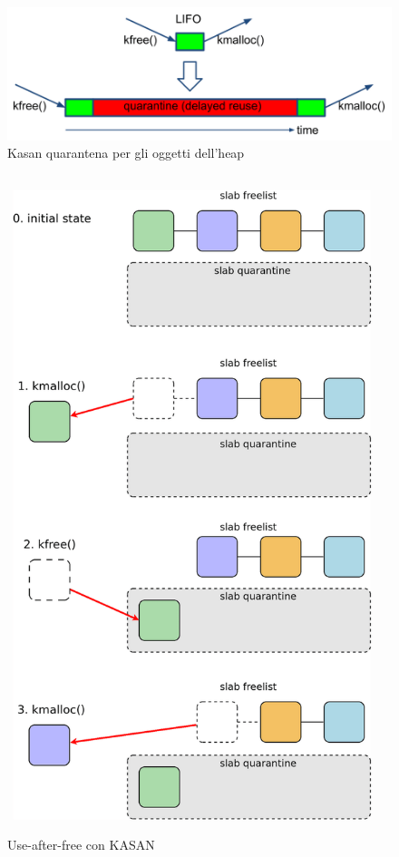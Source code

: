 \documentclass{article}
\begin{document}
\begin{figure}[h]
  \begin{center}
    \includegraphics[width=.7\textwidth]{figures/kasan-quarantine.png}
  \end{center}
  \caption{Kasan quarantena per gli oggetti dell'heap}\label{fig:kasan-quarantine}
\end{figure}

\begin{figure}[h]
  \begin{center}
    \includegraphics[width=.7\textwidth]{figures/kasan-quarantine-2.png}
  \end{center}
  \caption{Use-after-free con KASAN}\label{fig:kasan-quarantine-2}
\end{figure}
\end{document}
